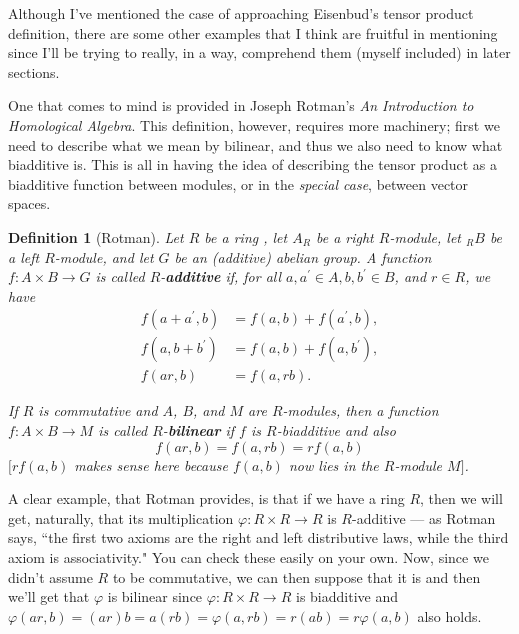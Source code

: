\documentclass[12pt,reqno]{amsart}
\theoremstyle{plain}
\newtheorem{defi}{Definition}
\begin{document}
Although I've mentioned the case of approaching Eisenbud's tensor product definition, there are some other examples that I think are fruitful in mentioning since I'll be trying to really, in a way, comprehend them (myself included) in later sections. 


One that comes to mind is provided in Joseph Rotman's \textit{An Introduction to Homological Algebra}. This definition, however, requires more machinery; first we need to describe what we mean by bilinear, and thus we also need to know what biadditive is.  This is all in having the idea of describing the tensor product as a biadditive function between modules, or in the \textit{special case}, between vector spaces. 
\begin{defi}[Rotman] Let $R$ be a ring , let $A_R$ be a right $R$-module, let $_R B$ be a left $R$-module, and let $G$ be an (additive) abelian group. A function $f \colon A \times B \to G$ is called $R$-\textbf{additive} if, for all $a, a^{\prime} \in A, b, b^{\prime} \in B$, and $r \in R$, we have 
\begin{align*}
f(a+a^{\prime}, b) &= f(a, b) + f(a^{\prime}, b), \\
f(a, b+b^{\prime}) &= f(a, b)+ f(a, b^{\prime}), \\
f(ar, b) &= f(a, rb).
\end{align*}

If $R$ is \textit{commutative} and $A$, $B$, and $M$ are $R$-modules, then a function $f \colon A \times B \to M$ is called $R$-\textbf{bilinear} if $f$ is $R$-biadditive and also
$$f (ar, b) = f(a, rb) = r f(a, b)$$
$[rf(a, b)$ makes sense here because $f(a, b)$ now lies in the $R$-module $M]$. 
\end{defi} 

A clear example, that Rotman provides,  is that if we have a ring $R$, then we will get, naturally, that its multiplication $\varphi \colon R \times R \to R$ is $R$-additive — as Rotman says, ``the first two axioms are the right and left distributive laws, while the third axiom is associativity." You can check these easily on your own.  Now, since we didn't assume $R$ to be commutative, we can then suppose that it is and then we'll get that $\varphi$ is bilinear since $\varphi \colon R \times R \to R$ is biadditive and $\varphi (ar, b) = (ar)b= a(rb) = \varphi (a, rb) = r(ab) = r \varphi (a, b)$ also holds. 
\end{document}
